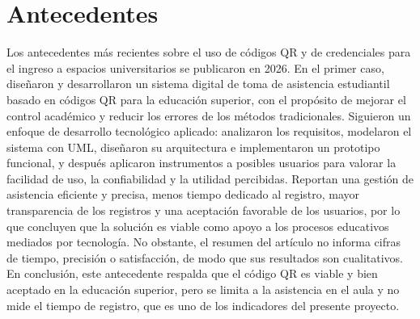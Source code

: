 \section{Antecedentes}
Los antecedentes más recientes sobre el uso de códigos QR y de credenciales
para el ingreso a espacios universitarios se publicaron en 2026. En el primer
caso, \textcite{cano2026sistema} diseñaron y desarrollaron un sistema digital
de toma de asistencia
estudiantil basado en códigos QR para la educación superior, con el propósito
de mejorar el control académico y reducir los errores de los métodos
tradicionales. Siguieron un enfoque de desarrollo tecnológico aplicado:
analizaron los requisitos, modelaron el sistema con UML, diseñaron su
arquitectura e implementaron un prototipo funcional, y después aplicaron
instrumentos a posibles usuarios para valorar la facilidad de uso, la
confiabilidad y la utilidad percibidas. Reportan una gestión de asistencia
eficiente y precisa, menos tiempo dedicado al registro, mayor transparencia de
los registros y una aceptación favorable de los usuarios, por lo que
concluyen que la solución es viable como apoyo a los procesos educativos
mediados por tecnología. No obstante, el resumen del artículo no informa
cifras de tiempo, precisión o satisfacción, de modo que sus resultados son
cualitativos. En conclusión, este antecedente respalda que el código QR es
viable y bien aceptado en la educación superior, pero se limita a la
asistencia en el aula y no mide el tiempo de registro, que es uno de los
indicadores del presente proyecto.


